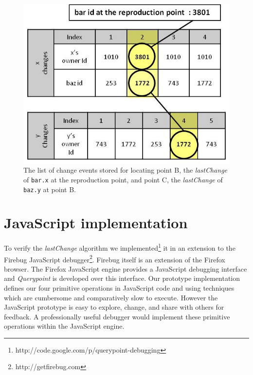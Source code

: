 \documentclass[runningheads,a4paper]{llncs}
\begin{document}
\begin{figure}[htp]
\centering 
\includegraphics[height=.3\textheight]{8-lastchange-lastchange.jpg}
\caption{The list of change events stored for locating point B, the
  \textit{lastChange} of \texttt{bar.x} at the reproduction point, and
  point C, the \textit{lastChange} of \texttt{baz.y} at point B.}
\label{fig:lastchange-lastchange}
\end{figure}



\section{JavaScript implementation}
To verify the \textit{lastChange} algorithm we
implemented\footnote[1]{http://code.google.com/p/querypoint-debugging} it in an extension to the Firebug
JavaScript debugger\footnote[2]{http://getfirebug.com}. %
Firebug itself is an extension of the Firefox browser.%
The Firefox JavaScript engine provides a JavaScript debugging interface \cite{JSD} and 
\textit{Querypoint} is developed over this interface. Our prototype implementation defines our four primitive operations in JavaScript code and using techniques which are cumbersome and comparatively slow to execute. However the JavaScript prototype is
easy to explore, change, and share with others for feedback.
  A professionally useful debugger would implement these primitive operations within the JavaScript engine.
\end{document}
